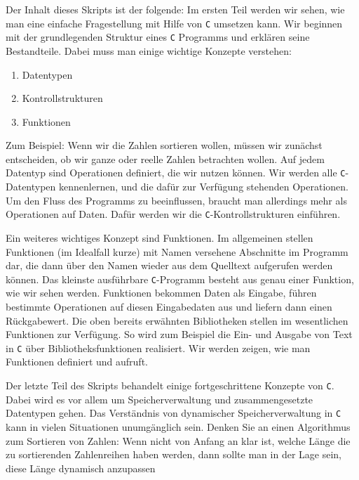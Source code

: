 Der Inhalt dieses Skripts ist der folgende: Im ersten Teil werden wir sehen, wie man eine einfache Fragestellung mit Hilfe von \texttt{C} umsetzen kann.
Wir beginnen mit der grundlegenden Struktur eines \texttt{C} Programms und erklären seine Bestandteile.
Dabei muss man einige wichtige Konzepte verstehen:
\begin{enumerate}
\item Datentypen
\item Kontrollstrukturen
\item Funktionen
\end{enumerate}
Zum Beispiel: Wenn wir die Zahlen sortieren wollen, müssen wir zunächst entscheiden, ob wir ganze oder reelle Zahlen betrachten wollen.
Auf jedem Datentyp sind Operationen definiert, die wir nutzen können.
Wir werden alle \texttt{C}-Datentypen kennenlernen, und die dafür zur Verfügung stehenden Operationen.
Um den Fluss des Programms zu beeinflussen, braucht man allerdings mehr als Operationen auf Daten.
Dafür werden wir die \texttt{C}-Kontrollstrukturen einführen.

Ein weiteres wichtiges Konzept sind Funktionen.
Im allgemeinen stellen Funktionen (im Idealfall kurze) mit Namen versehene Abschnitte im Programm dar, die dann über den Namen wieder aus dem Quelltext aufgerufen werden können.
Das kleinste ausführbare \texttt{C}-Programm besteht aus genau einer Funktion, wie wir sehen werden.
Funktionen bekommen Daten als Eingabe, führen bestimmte Operationen auf diesen Eingabedaten aus und liefern dann einen Rückgabewert.
Die oben bereits erwähnten Bibliotheken stellen im wesentlichen Funktionen zur Verfügung.
So wird zum Beispiel die Ein- und Ausgabe von Text in \texttt{C} über Bibliotheksfunktionen realisiert.
Wir werden zeigen, wie man Funktionen definiert und aufruft.

Der letzte Teil des Skripts behandelt einige fortgeschrittene Konzepte von \texttt{C}.
Dabei wird es vor allem um Speicherverwaltung und zusammengesetzte Datentypen gehen.
Das Verständnis von dynamischer Speicherverwaltung in \texttt{C} kann in vielen Situationen unumgänglich sein.
Denken Sie an einen Algorithmus zum Sortieren von Zahlen: Wenn nicht von Anfang an klar ist, welche Länge die zu sortierenden Zahlenreihen haben werden, dann sollte man in der Lage sein, diese Länge dynamisch anzupassen

